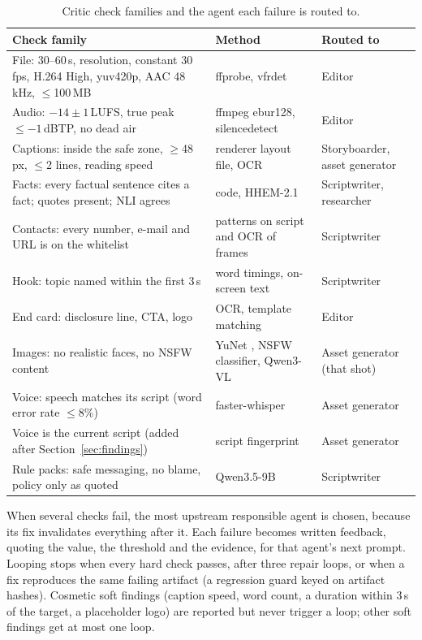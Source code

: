 \documentclass[twoside,11pt]{article}
\begin{document}
\begin{table}[t]
\centering
\small
\begin{tabularx}{\textwidth}{@{}Lp{4.1cm}p{3.0cm}@{}}
\toprule
Check family & Method & Routed to \\
\midrule
File: 30--60\,s, resolution, constant 30\,fps, H.264 High, yuv420p, AAC 48\,kHz, $\leq$100\,MB & ffprobe, vfrdet & Editor \\
Audio: $-14\pm1$\,LUFS, true peak $\leq -1$\,dBTP, no dead air \citep{itu2015bs1770,ebu2020r128} & ffmpeg ebur128, silencedetect & Editor \\
Captions: inside the safe zone, $\geq$48\,px, $\leq$2 lines, reading speed & renderer layout file, OCR & Storyboarder, asset generator \\
Facts: every factual sentence cites a fact; quotes present; NLI agrees & code, HHEM-2.1 & Scriptwriter, researcher \\
Contacts: every number, e-mail and URL is on the whitelist & patterns on script and OCR of frames & Scriptwriter \\
Hook: topic named within the first 3\,s & word timings, on-screen text & Scriptwriter \\
End card: disclosure line, CTA, logo & OCR, template matching & Editor \\
Images: no realistic faces, no NSFW content & YuNet \citep{wu2023yunet}, NSFW classifier, Qwen3-VL & Asset generator (that shot) \\
Voice: speech matches its script (word error rate $\leq$8\%) & faster-whisper \citep{radford2023whisper,fasterwhisper} & Asset generator \\
Voice is the current script (added after Section~\ref{sec:findings}) & script fingerprint & Asset generator \\
Rule packs: safe messaging, no blame, policy only as quoted & Qwen3.5-9B & Scriptwriter \\
\bottomrule
\end{tabularx}
\caption{Critic check families and the agent each failure is routed to.}
\label{tab:checks}
\end{table}

When several checks fail, the most upstream responsible agent is chosen, because its fix invalidates everything after it. Each failure becomes written feedback, quoting the value, the threshold and the evidence, for that agent's next prompt. Looping stops when every hard check passes, after three repair loops, or when a fix reproduces the same failing artifact (a regression guard keyed on artifact hashes). Cosmetic soft findings (caption speed, word count, a duration within 3\,s of the target, a placeholder logo) are reported but never trigger a loop; other soft findings get at most one loop.
\end{document}
